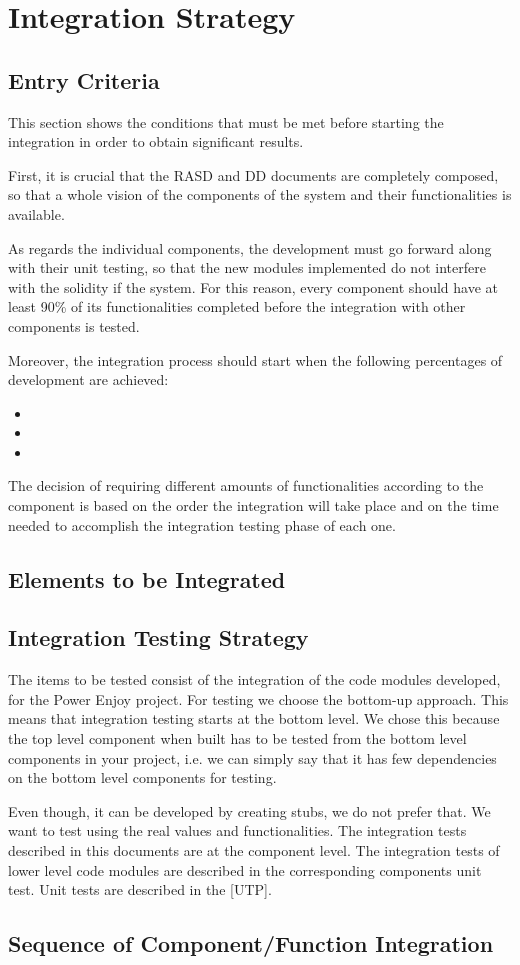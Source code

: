 \chapter{Integration Strategy}

\section{Entry Criteria}
This section shows the conditions that must be met before starting the integration in order to obtain significant results.

First, it is crucial that the RASD and DD documents are completely composed, so that a whole vision of the components of the system and their functionalities is available.

As regards the individual components, the development must go forward along with their unit testing, so that the new modules implemented do not interfere with the solidity if the system. For this reason, every component should have at least 90\% of its functionalities completed before the integration with other components is tested.

Moreover, the integration process should start when the following percentages of development are achieved:
\begin{itemize}
	\item 
	\item 
	\item 
\end{itemize}

The decision of requiring different amounts of functionalities according to the component is based on the order the integration will take place and on the time needed to accomplish the integration testing phase of each one.


\section{Elements to be Integrated}

\section{Integration Testing Strategy}
The items to be tested consist of the integration of the code modules developed, for the
Power Enjoy project. For testing we choose the bottom-up approach. This means that integration
testing starts at the bottom level. We chose this because the top level component when built has to be tested from the bottom level components in your project, i.e. we can simply say that it has few dependencies on the bottom level components for testing.

Even though, it can be developed by creating stubs, we do not prefer that.
We want to test using the real values and functionalities. The integration tests described in this documents are at the component
level. The integration tests of lower level code modules are described in the corresponding
components unit test. Unit tests are described in the [UTP].

\section{Sequence of Component/Function Integration}